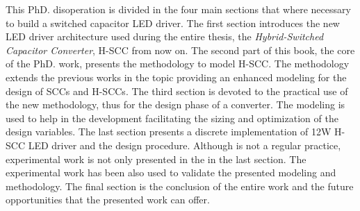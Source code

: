 This PhD. disoperation is divided in the four main sections that where necessary to build a switched capacitor LED driver. The first section introduces the new LED driver architecture used during the entire thesis, the \emph{Hybrid-Switched Capacitor Converter}, H-SCC from now on. The second part of this book, the core of the PhD. work, presents the methodology to model H-SCC. The methodology extends the previous works in the topic providing an enhanced modeling for the design of SCCs and H-SCCs. The third section is devoted to the practical use of the new methodology, thus for the design phase of a converter. The modeling is used  to help in the development facilitating the sizing and optimization of the design variables. The last section presents a discrete implementation of 12W H-SCC LED driver and the design procedure. Although is not a regular practice, experimental work is not only presented in the in the last section. The experimental work has been also  used to validate the presented modeling and methodology. The final section is the conclusion of the entire work and the future opportunities that the presented work can offer.
